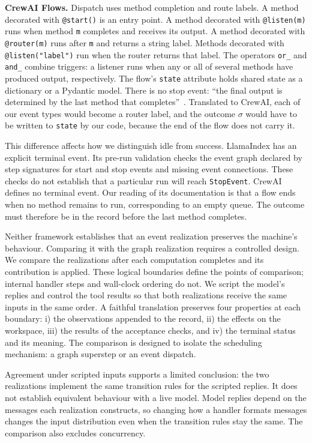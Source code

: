 \item \textbf{CrewAI Flows.} Dispatch uses method completion and route labels. A method decorated
with \texttt{@start()} is an entry point. A method decorated with \texttt{@listen(m)} runs when
method \texttt{m} completes and receives its output. A method decorated with \texttt{@router(m)}
runs after \texttt{m} and returns a string label. Methods decorated with \texttt{@listen("label")}
run when the router returns that label. The operators \texttt{or\_} and \texttt{and\_} combine
triggers: a listener runs when any or all of several methods have produced output, respectively.
The flow's \texttt{state} attribute holds shared state as a dictionary or a Pydantic model. There is
no stop event: ``the final output is determined by the last method that completes''~\citep{crewai-flows}.
Translated to CrewAI, each of our event types would become a router label, and the outcome
$\sigma$ would have to be written to \texttt{state} by our code, because the end of the flow does
not carry it.

\ei

This difference affects how we distinguish idle from success. LlamaIndex has an explicit terminal
event. Its pre-run validation checks the event graph declared by step signatures for start and
stop events and missing event connections. These checks do not establish that a particular run
will reach \texttt{StopEvent}. CrewAI defines no terminal event. Our reading of its documentation
is that a flow ends when no method remains to run, corresponding to an empty queue. The outcome
must therefore be in the record before the last method completes.

Neither framework establishes that an event realization preserves the machine's behaviour. Comparing it
with the graph realization requires a controlled design. We compare the realizations after each
computation completes and its contribution is applied. These logical boundaries define the points
of comparison; internal handler steps and wall-clock ordering do not. We script the model's replies
and control the tool results so that both realizations receive the same inputs in the same order.
A faithful translation preserves four properties at each boundary: i) the observations appended
to the record, ii) the effects on the workspace, iii) the results of the acceptance checks, and
iv) the terminal status and its meaning. The comparison is designed to isolate the scheduling
mechanism: a graph superstep or an event dispatch.

Agreement under scripted inputs supports a limited conclusion: the two realizations implement the
same transition rules for the scripted replies. It does not establish equivalent behaviour with a
live model. Model replies depend on the messages each realization constructs, so changing how a
handler formats messages changes the input distribution even when the transition rules stay the
same. The comparison also excludes concurrency.

